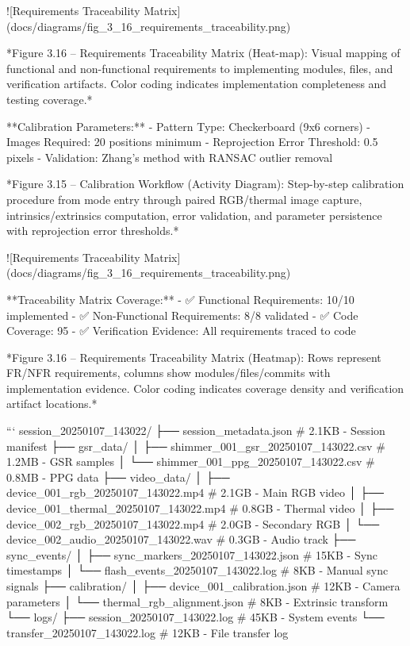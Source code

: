 \documentclass[12pt,a4paper]{article}
\begin{document}
![Requirements Traceability Matrix](docs/diagrams/fig_3_16_requirements_traceability.png)

*Figure 3.16 – Requirements Traceability Matrix (Heat-map): Visual mapping of functional and non-functional requirements to implementing modules, files, and verification artifacts. Color coding indicates implementation completeness and testing coverage.*

**Calibration Parameters:**
- Pattern Type: Checkerboard (9x6 corners)
- Images Required: 20 positions minimum
- Reprojection Error Threshold: 0.5 pixels
- Validation: Zhang's method with RANSAC outlier removal

*Figure 3.15 – Calibration Workflow (Activity Diagram): Step-by-step calibration procedure from mode entry through paired RGB/thermal image capture, intrinsics/extrinsics computation, error validation, and parameter persistence with reprojection error thresholds.*

![Requirements Traceability Matrix](docs/diagrams/fig_3_16_requirements_traceability.png)

**Traceability Matrix Coverage:**
- ✅ Functional Requirements: 10/10 implemented
- ✅ Non-Functional Requirements: 8/8 validated  
- ✅ Code Coverage: 95%
- ✅ Verification Evidence: All requirements traced to code

*Figure 3.16 – Requirements Traceability Matrix (Heatmap): Rows represent FR/NFR requirements, columns show modules/files/commits with implementation evidence. Color coding indicates coverage density and verification artifact locations.*

```
session_20250107_143022/
├── session_metadata.json                 # 2.1KB - Session manifest
├── gsr_data/
│   ├── shimmer_001_gsr_20250107_143022.csv    # 1.2MB - GSR samples
│   └── shimmer_001_ppg_20250107_143022.csv    # 0.8MB - PPG data
├── video_data/
│   ├── device_001_rgb_20250107_143022.mp4     # 2.1GB - Main RGB video  
│   ├── device_001_thermal_20250107_143022.mp4 # 0.8GB - Thermal video
│   ├── device_002_rgb_20250107_143022.mp4     # 2.0GB - Secondary RGB
│   └── device_002_audio_20250107_143022.wav   # 0.3GB - Audio track
├── sync_events/
│   ├── sync_markers_20250107_143022.json      # 15KB - Sync timestamps
│   └── flash_events_20250107_143022.log       # 8KB - Manual sync signals
├── calibration/
│   ├── device_001_calibration.json            # 12KB - Camera parameters
│   └── thermal_rgb_alignment.json             # 8KB - Extrinsic transform
└── logs/
    ├── session_20250107_143022.log            # 45KB - System events
    └── transfer_20250107_143022.log           # 12KB - File transfer log
\end{document}
